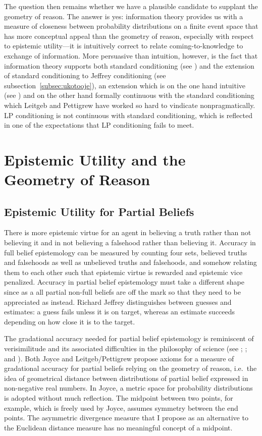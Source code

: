 \documentclass[phd,12pt,oneside]{ubcthesis}
\begin{document}
The question then remains whether we have a plausible candidate to
supplant the geometry of reason. The answer is yes: information theory
provides us with a measure of closeness between probability
distributions on a finite event space that has more conceptual appeal
than the geometry of reason, especially with respect to epistemic
utility---it is intuitively correct to relate coming-to-knowledge to
exchange of information. More persuasive than intuition, however, is
the fact that information theory supports both standard conditioning
(see ) and the extension of standard
conditioning to Jeffrey conditioning (see
subsection~\ref{subsec:ukotooje}), an extension which is on the one
hand intuitive (see ) and on the other hand
formally continuous with the standard conditioning which Leitgeb and
Pettigrew have worked so hard to vindicate nonpragmatically. LP
conditioning is not continuous with standard conditioning, which is
reflected in one of the expectations that LP conditioning fails to
meet.

\section{Epistemic Utility and the Geometry of Reason}
\label{sec:chuweiyo}

\subsection{Epistemic Utility for Partial Beliefs}
\label{subsec:oochihei}

There is more epistemic virtue for an agent in believing a truth
rather than not believing it and in not believing a falsehood rather
than believing it. Accuracy in full belief epistemology can be
measured by counting four sets, believed truths and falsehoods as well
as unbelieved truths and falsehoods, and somehow relating them to each
other such that epistemic virtue is rewarded and epistemic vice
penalized. Accuracy in partial belief epistemology must take a
different shape since as a  all partial non-full beliefs
are off the mark so that they need to be appreciated as
 instead. Richard Jeffrey distinguishes between
guesses and estimates: a guess fails unless it is on target, whereas
an estimate succeeds depending on how close it is to the target.

The gradational accuracy needed for partial belief epistemology is
reminiscent of verisimilitude and its associated difficulties in the
philosophy of science (see ;
; and ). Both Joyce and
Leitgeb/Pettigrew propose axioms for a measure of gradational accuracy
for partial beliefs relying on the geometry of reason, i.e.\ the idea
of geometrical distance between distributions of partial belief
expressed in non-negative real numbers. In Joyce, a metric space for
probability distributions is adopted without much reflection. The
midpoint between two points, for example, which is freely used by
Joyce, assumes symmetry between the end points. The asymmetric
divergence measure that I propose as an alternative to the Euclidean
distance measure has no meaningful concept of a midpoint.
\end{document}
